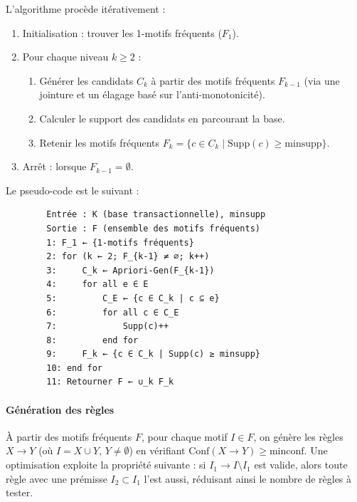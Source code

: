 \documentclass[a4paper,14pt]{article}
\begin{document}
        L’algorithme procède itérativement :
        \begin{enumerate}
            \item Initialisation : trouver les 1-motifs fréquents (\( F_1 \)).
            \item Pour chaque niveau \( k \geq 2 \) :
                \begin{enumerate}
                    \item Générer les candidats \( C_k \) à partir des motifs fréquents \( F_{k-1} \) (via une jointure et un élagage basé sur l’anti-monotonicité).
                    \item Calculer le support des candidats en parcourant la base.
                    \item Retenir les motifs fréquents \( F_k = \{c \in C_k \mid \text{Supp}(c) \geq \text{minsupp}\} \).
                \end{enumerate}
            \item Arrêt : lorsque \( F_{k-1} = \emptyset \).
        \end{enumerate}
        
        Le pseudo-code est le suivant :
        \begin{verbatim}
        Entrée : K (base transactionnelle), minsupp
        Sortie : F (ensemble des motifs fréquents)
        1: F_1 ← {1-motifs fréquents}
        2: for (k ← 2; F_{k-1} ≠ ∅; k++)
        3:     C_k ← Apriori-Gen(F_{k-1})
        4:     for all e ∈ E
        5:         C_E ← {c ∈ C_k | c ⊆ e}
        6:         for all c ∈ C_E
        7:             Supp(c)++
        8:         end for
        9:     F_k ← {c ∈ C_k | Supp(c) ≥ minsupp}
        10: end for
        11: Retourner F ← ∪_k F_k
        \end{verbatim}
        
        \paragraph{Génération des règles}
        
        À partir des motifs fréquents \( F \), pour chaque motif \( I \in F \), on génère les règles \( X \rightarrow Y \) (où \( I = X \cup Y \), \( Y \neq \emptyset \)) en vérifiant \( \text{Conf}(X \rightarrow Y) \geq \text{minconf} \). Une optimisation \cite{AS94} exploite la propriété suivante : si \( I_1 \rightarrow I \setminus I_1 \) est valide, alors toute règle avec une prémisse \( I_2 \subset I_1 \) l’est aussi, réduisant ainsi le nombre de règles à tester.
        
\end{document}
